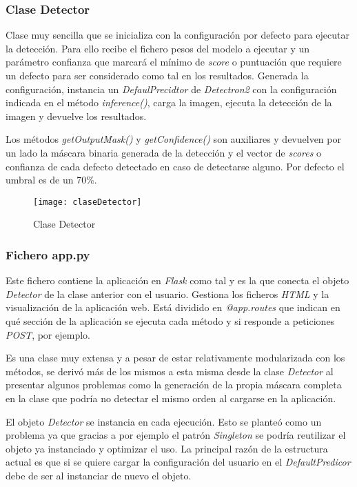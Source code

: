 \subsubsection{Clase Detector}

Clase muy sencilla que se inicializa con la configuración por defecto para ejecutar la detección. Para ello recibe el fichero pesos del modelo a ejecutar y un parámetro confianza que marcará el mínimo de \emph{score} o puntuación que requiere un defecto para ser considerado como tal en los resultados. 
Generada la configuración, instancia un \emph{DefaulPrecidtor} de \emph{Detectron2} con la configuración indicada en el método \emph{inference()}, carga la imagen, ejecuta la detección de la imagen y devuelve los resultados. 

Los métodos \emph{getOutputMask()} y \emph{getConfidence()} son auxiliares y devuelven por un lado la máscara binaria generada de la detección y el vector de \emph{scores} o confianza de cada defecto detectado en caso de detectarse alguno. Por defecto el umbral es de un 70\%.

\begin{figure}[htb]
	\centering
	\texttt{[image: claseDetector]}
	\caption[Clase Detector]{Clase Detector}
\end{figure}

\subsubsection{Fichero app.py}
Este fichero contiene la aplicación en \emph{Flask} como tal y es la que conecta el objeto \emph{Detector} de la clase anterior con el usuario. Gestiona los ficheros \emph{HTML} y la visualización de la aplicación web. Está dividido en \emph{@app.routes} que indican en qué sección de la aplicación se ejecuta cada método y si responde a peticiones \emph{POST}, por ejemplo.

Es una clase muy extensa y a pesar de estar relativamente modularizada con los métodos, se derivó más de los mismos a esta misma desde la clase \emph{Detector} al presentar algunos problemas como la generación de la propia máscara completa en la clase que podría no detectar el mismo orden al cargarse en la aplicación.

El objeto \emph{Detector} se instancia en cada ejecución. Esto se planteó como un problema ya que gracias a por ejemplo el patrón \emph{Singleton} se podría reutilizar el objeto ya instanciado y optimizar el uso. La principal razón de la estructura actual es que si se quiere cargar la configuración del usuario en el \emph{DefaultPredicor} debe de ser al instanciar de nuevo el objeto. 

